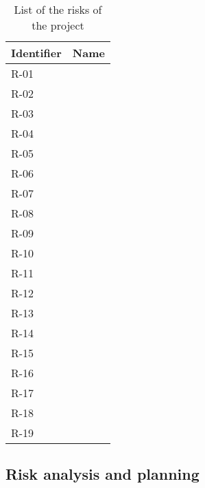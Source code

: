 \begin{table}[H]
	\begin{tabularx}{\textwidth}{|l|X|}
		\hline
		\rowcolor{gray!30}
		Identifier & Name \\ \hline
		R-01 & \Runo \\ \hline
		R-02 & \Rdos \\ \hline
		R-03 & \Rtres \\ \hline
		R-04 & \Rcuatro \\ \hline
		R-05 & \Rcinco \\ \hline
		R-06 & \Rseis \\ \hline
		R-07 & \Rsiete \\ \hline
		R-08 & \Rocho \\ \hline
		R-09 & \Rnueve \\ \hline
		R-10 & \Rdiez \\ \hline
		R-11 & \Ronce \\ \hline
		R-12 & \Rdoce \\ \hline
		R-13 & \Rtrece \\ \hline
		R-14 & \Rcatorce \\ \hline
		R-15 & \Rquince \\ \hline
		R-16 & \Rdieciseis \\ \hline
		R-17 & \Rdiecisiete \\ \hline
		R-18 & \Rdieciocho \\ \hline
		R-19 & \Rdiecinueve \\ \hline
	\end{tabularx}
	\caption{List of the risks of the project}
\end{table}





\subsection{Risk analysis and planning}


